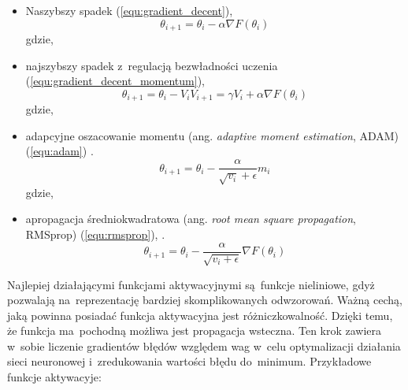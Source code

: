 {\begin{itemize}
\item Naszybszy spadek (\ref{equ:gradient_decent}),
\begin{equation}
\theta_{i+1} = \theta_i - \alpha \nabla F(\theta_i)
\label{equ:gradient_decent}
\end{equation}
gdzie,
\item najszybszy spadek z~regulacją bezwładności uczenia (\ref{equ:gradient_decent_momentum}),
\begin{equation}
\theta_{i+1} = \theta_i - V_i
V_{i+1} = \gamma V_i + \alpha \nabla F(\theta_i)
\label{equ:gradient_decent_momentum}
\end{equation}
gdzie,
\item adapcyjne oszacowanie momentu (ang. \textit{adaptive moment estimation}, ADAM) (\ref{equ:adam}) \cite{Kingma2014AdamAM}.
\begin{equation}
\theta_{i+1} = \theta_i - \frac{\alpha}{\sqrt{v_i} + \epsilon} m_i
\label{equ:adam}
\end{equation}
gdzie,
\item apropagacja średniokwadratowa (ang. \textit{root mean square propagation}, RMSprop) (\ref{equ:rmsprop}), \cite{Kurbiel2017TrainingOD}.
\begin{equation}
\theta_{i+1} = \theta_i - \frac{\alpha}{\sqrt{v_i + \epsilon}} \nabla F(\theta_i)
\label{equ:rmsprop}
\end{equation}
\end{itemize}

Najlepiej działającymi funkcjami aktywacyjnymi są~funkcje nieliniowe, gdyż pozwalają na~reprezentację bardziej skomplikowanych odwzorowań. Ważną cechą, jaką powinna posiadać funkcja aktywacyjna jest różniczkowalność. Dzięki temu, że funkcja ma~pochodną możliwa jest propagacja wsteczna. Ten krok zawiera w~sobie liczenie gradientów błędów względem wag w~celu optymalizacji działania sieci neuronowej i~zredukowania wartości błędu do~minimum. Przykładowe funkcje aktywacyje:

}
